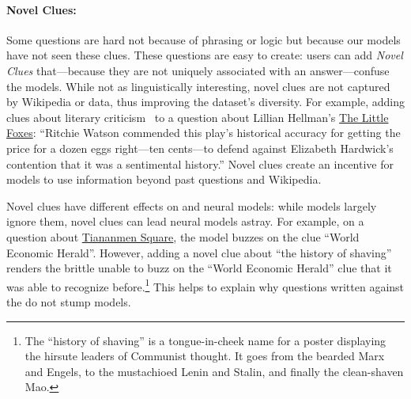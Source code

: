 \paragraph{Novel Clues:} Some \challenge{} questions are hard
not because of phrasing or logic but because our models have
not seen these clues.  These questions are easy
to create: users can add \emph{Novel Clues} that---because they are
not uniquely associated with an answer---confuse the models.
While not as linguistically interesting, novel clues are
not captured by Wikipedia or \qb{} data, thus improving the
dataset's diversity.  For example, adding clues about literary
criticism~\cite{hardwick-67,watson-96} to a question about Lillian
Hellman's \underline{The Little Foxes}: ``Ritchie Watson commended
this play's historical accuracy for getting the price for a dozen eggs
right---ten cents---to defend against Elizabeth Hardwick's contention
that it was a sentimental history.'' Novel clues create 
an incentive for models to use
information beyond past questions and Wikipedia.

Novel clues have different effects on  and neural models:
while  models largely ignore them, novel clues can lead
neural models astray.  For example, on a question about \underline{Tiananmen
Square}, the  model buzzes on
the clue ``World Economic Herald''.  However, adding a novel clue
about ``the history of shaving''
renders the brittle  unable to buzz on the ``World Economic
Herald'' clue that it was able to recognize before.\footnote{The ``history of shaving'' is a tongue-in-cheek name for a poster
displaying the hirsute leaders of Communist thought. It goes from the bearded Marx and Engels,
to the mustachioed Lenin and Stalin, and finally the clean-shaven Mao.}  This helps
to explain why \challenge{} questions written against the 
do not stump  models.
